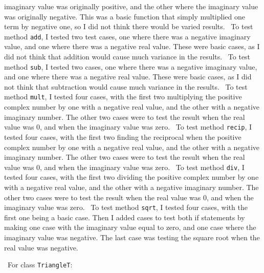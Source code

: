\documentclass[12pt]{article}
\begin{document}
imaginary value was originally positive, and the other where the imaginary value 
was originally negative. This was a basic function that simply multiplied one 
term by negative one, so I did not think there would be varied results. 
~\newline\noindent To test method \verb|add|, I tested two test cases, one where 
there was a negative imaginary value, and one where there was a negative real 
value. These were basic cases, as I did not think that addition would cause much 
variance in the results. 
~\newline\noindent To test method \verb|sub|, I tested two cases, one where there 
was a negative imaginary value, and one where there was a negative real value. 
These were basic cases, as I did not think that subtraction would cause much 
variance in the results. 
~\newline\noindent To test method \verb|mult|, I tested four cases, with the 
first two multiplying the positive complex number by one with a negative real 
value, and the other with a negative imaginary number. The other two cases were 
to test the result when the real value was 0, and when the imaginary value was zero. 
~\newline\noindent To test method \verb|recip|, I tested four cases, with the 
first two finding the reciprocal when the positive complex number by one with 
a negative real value, and the other with a negative imaginary number. The other 
two cases were to test the result when the real value was 0, and when the imaginary value was zero. 
~\newline\noindent To test method \verb|div|, I tested four cases, with the first 
two dividing the positive complex number by one with a negative real value, and 
the other with a negative imaginary number. The other two cases were to test the 
result when the real value was 0, and when the imaginary value was zero. 
~\newline\noindent To test method \verb|sqrt|, I tested four cases, with the first 
one being a basic case. Then I added cases to test both if statements by making 
one case with the imaginary value equal to zero, and one case where the imaginary 
value was negative. The last case was testing the square root when the real value 
was negative. 

~\newline\noindent For class \verb|TriangleT|:
\end{document}
